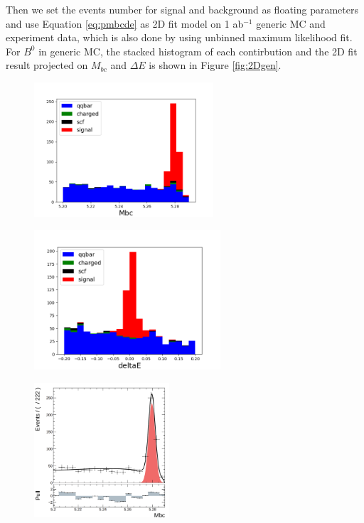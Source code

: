 Then we set the events number for signal and background as floating parameters and use Equation \ref{eq:pmbcde} as 2D fit model on 1 ab$^{-1}$ generic MC and experiment data, which is also done by using unbinned maximum likelihood fit.
For $B^0$ in generic MC, the stacked histogram of each contirbution and the 2D fit result projected on $M_{bc}$ and $\Delta E$ is shown in Figure \ref{fig:2Dgen}.
\begin{figure}[H]
	\begin{minipage}[b]{0.5\linewidth}
		\centering 
		\includegraphics[height=5cm]{figures/hist_stacked_generic_mbc}
		\label{}
	\end{minipage}
	\begin{minipage}[b]{0.5\linewidth}
		\centering 
		\includegraphics[height=5.2cm]{figures/hist_stacked_generic_dE}
		\label{}
	\end{minipage}
	\begin{minipage}[b]{0.5\linewidth}
		\centering 
		\includegraphics[height=5cm]{figures/mbc-hist-2d}
		\label{}
	\end{minipage}

\end{figure}
